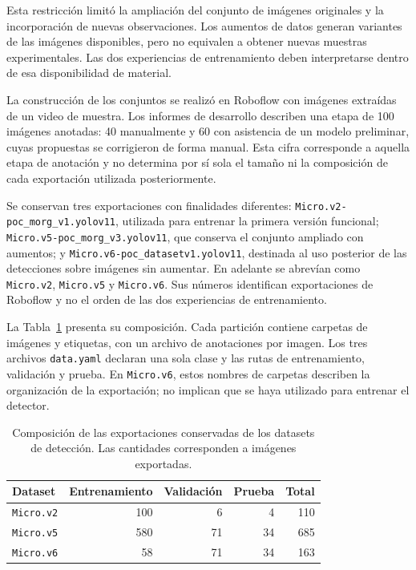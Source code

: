 Esta restricción limitó la ampliación del conjunto de imágenes originales y la incorporación de nuevas observaciones. Los aumentos de datos generan variantes de las imágenes disponibles, pero no equivalen a obtener nuevas muestras experimentales. Las dos experiencias de entrenamiento deben interpretarse dentro de esa disponibilidad de material.

La construcción de los conjuntos se realizó en Roboflow con imágenes extraídas de un video de muestra. Los informes de desarrollo describen una etapa de 100 imágenes anotadas: 40 manualmente y 60 con asistencia de un modelo preliminar, cuyas propuestas se corrigieron de forma manual. Esta cifra corresponde a aquella etapa de anotación y no determina por sí sola el tamaño ni la composición de cada exportación utilizada posteriormente.

Se conservan tres exportaciones con finalidades diferentes: \nolinkurl{Micro.v2-poc_morg_v1.yolov11}, utilizada para entrenar la primera versión funcional; \nolinkurl{Micro.v5-poc_morg_v3.yolov11}, que conserva el conjunto ampliado con aumentos; y \nolinkurl{Micro.v6-poc_datasetv1.yolov11}, destinada al uso posterior de las detecciones sobre imágenes sin aumentar. En adelante se abrevían como \texttt{Micro.v2}, \texttt{Micro.v5} y \texttt{Micro.v6}. Sus números identifican exportaciones de Roboflow y no el orden de las dos experiencias de entrenamiento.

La Tabla~\ref{tab:dataset-deteccion} presenta su composición. Cada partición contiene carpetas de imágenes y etiquetas, con un archivo de anotaciones por imagen. Los tres archivos \texttt{data.yaml} declaran una sola clase y las rutas de entrenamiento, validación y prueba. En \texttt{Micro.v6}, estos nombres de carpetas describen la organización de la exportación; no implican que se haya utilizado para entrenar el detector.

\begin{table}[H]
  \centering
  \caption{Composición de las exportaciones conservadas de los datasets de detección. Las cantidades corresponden a imágenes exportadas.}
  \label{tab:dataset-deteccion}
  \begin{tabular}{lrrrr}
    \toprule
    Dataset & Entrenamiento & Validación & Prueba & Total \\
    \midrule
    \texttt{Micro.v2} & 100 & 6 & 4 & 110 \\
    \texttt{Micro.v5} & 580 & 71 & 34 & 685 \\
    \texttt{Micro.v6} & 58 & 71 & 34 & 163 \\
    \bottomrule
  \end{tabular}
\end{table}

